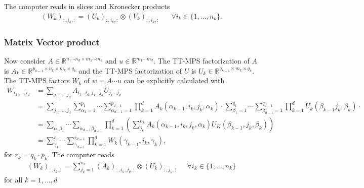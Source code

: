 \documentclass[a4paper]{article}
\begin{document}
The computer reads in slices and Kronecker products
\begin{align}
    (W_k)_{:, i_k, :} = (U_k)_{:, i_k, :} \otimes (V_k)_{:, i_k, :}
    \;\;\;\;\;\; \forall i_k \in \{1, \dots, n_k\}.
\end{align}
\subsubsection{Matrix Vector product}
Now consider $A\in \mathbb{R}^{n_1\cdots n_d \times m_1 \cdots m_d}$ and
$u \in \mathbb{R}^{m_1 \cdots m_d}$. The TT-MPS factorization of $A$ is $A_k
\in \mathbb{R}^{p_{k-1} \times n_k \times m_k \times q_k}$ and the TT-MPS
factorization of $U$ is $U_k \in \mathbb{R}^{q_{k-1} \times m_k \times q_k}$.
The TT-MPS factors $W_k$ of $w = A\cdots u$ can be explicitly calculated with
\begin{align}
    W_{i_1,\dots, i_d} &= \sum_{j_1,\dots,j_d} A_{i_1\cdots i_d, j_1\cdots
        j_d} U_{j_1\cdots j_d}\nonumber \\
        &= \sum_{j_1, \dots, j_d}
        \sum_{\alpha_1=1}^{p_1} \cdots \sum_{\alpha_{d-1}=1}^{p_{d-1}}
        \prod_{k=1}^d A_k(\alpha_{k-1}, i_k, j_k, \alpha_k) \cdot
        \sum_{\beta_1=1}^{q_1} \cdots \sum_{\beta_{d-1}=1}^{q_{d-1}}
        \prod_{k=1}^d U_k(\beta_{k-1} j_k, \beta_k) \cdot \nonumber\\
        &= \sum_{\alpha_1\beta_1} \cdots \sum_{\alpha_{d-1}\beta_{d-1}}
        \prod_{k=1}^{d} \left(
        \sum_{j_k}^{n_k} A_k(\alpha_{k-1}, i_k, j_k, \alpha_k)
        U_K(\beta_{k-1}, j_k, \beta_k)
        \right) \nonumber \\
        &= \sum_{\gamma_1}^{r_1} \cdots \sum_{\gamma_{d-1}}^{r_{d-1}}
        \prod_{k=1}^{d} W_k(\gamma_{k-1}, i_k, \gamma_k),
\end{align}
for $r_k = q_k \cdot p_k$.
The computer reads
\begin{align}
    (W_k)_{:, i_k, :} = \sum_{j_k=1}^{n_k} (A_k)_{:, i_k, j_k, :} \otimes
    (U_k)_{:, j_k, :} \;\;\;\;\; \forall i_k \in \{1, \dots, n_k\}
\end{align}
for all $k = 1,\dots, d$
\end{document}
